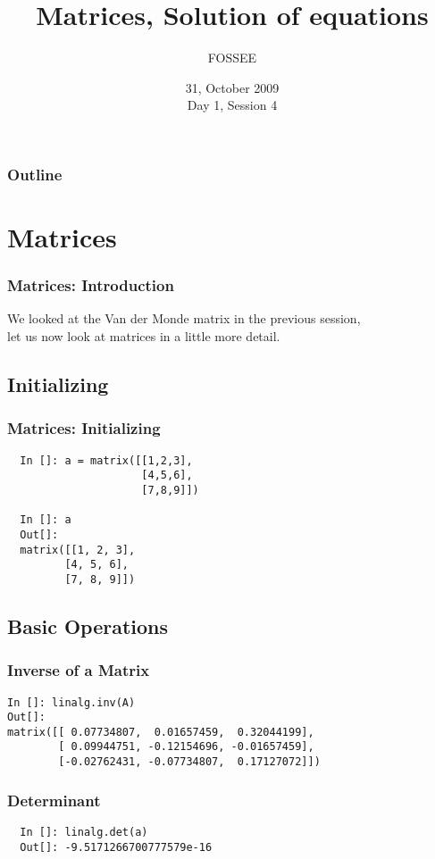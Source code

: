 \documentclass[14pt,compress]{beamer}
\title[Basic Python]{Matrices, Solution of equations}
\author[FOSSEE] {FOSSEE}
\institute[IIT Bombay] {Department of Aerospace Engineering\\IIT Bombay}
\date[] {31, October 2009\\Day 1, Session 4}
\begin{document}
\begin{frame}
  \titlepage
\end{frame}

\begin{frame}
  \frametitle{Outline}
  \tableofcontents
\end{frame}

\section{Matrices}

\begin{frame}
\frametitle{Matrices: Introduction}
We looked at the Van der Monde matrix in the previous session,\\ 
let us now look at matrices in a little more detail.
\end{frame}

\subsection{Initializing}
\begin{frame}[fragile]
\frametitle{Matrices: Initializing}
\begin{lstlisting}
  In []: a = matrix([[1,2,3],
                     [4,5,6],
                     [7,8,9]])

  In []: a
  Out[]: 
  matrix([[1, 2, 3],
         [4, 5, 6],
         [7, 8, 9]])
\end{lstlisting}
\end{frame}

\subsection{Basic Operations}
\begin{frame}[fragile]
\frametitle{Inverse of a Matrix}

\begin{small}
\begin{lstlisting}
In []: linalg.inv(A)
Out[]: 
matrix([[ 0.07734807,  0.01657459,  0.32044199],
        [ 0.09944751, -0.12154696, -0.01657459],
        [-0.02762431, -0.07734807,  0.17127072]])

\end{lstlisting}
\end{small}
\end{frame}

\begin{frame}[fragile]
\frametitle{Determinant}
\begin{lstlisting}
  In []: linalg.det(a)
  Out[]: -9.5171266700777579e-16
\end{lstlisting}
\end{frame}
\end{document}
